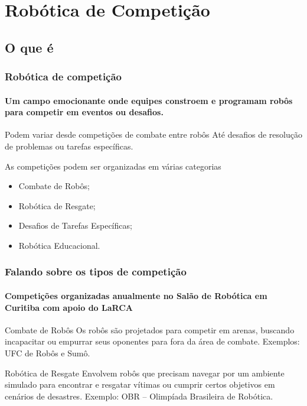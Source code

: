 \documentclass{beamer}
\begin{document}
\section{Robótica de Competição}

\subsection{O que é}

\begin{frame}
	\frametitle{Robótica de competição}
	\framesubtitle{Um campo emocionante onde equipes constroem e programam robôs para competir em eventos ou desafios.}
	\begin{block}{Podem variar desde competições de combate entre robôs}
		Até desafios de resolução de problemas ou tarefas específicas. 
	\end{block}
	
	\begin{block}{As competições podem ser organizadas em várias categorias}
		\begin{itemize}
			\item Combate de Robôs;
			\item Robótica de Resgate;
			\item Desafios de Tarefas Específicas;
			\item Robótica Educacional.
		\end{itemize}
	\end{block}

\end{frame}

\begin{frame}
	\frametitle{Falando sobre os tipos de competição}
	\framesubtitle{Competições organizadas anualmente no Salão de Robótica em Curitiba com apoio do LaRCA}
	\begin{block}{Combate de Robôs}
		Os robôs são projetados para competir em arenas, buscando incapacitar ou empurrar seus oponentes para fora da área de combate.
		\linebreak
		\linebreak
		Exemplos: UFC de Robôs e Sumô.
	\end{block}
	\begin{block}{Robótica de Resgate}
		Envolvem robôs que precisam navegar por um ambiente simulado para encontrar e resgatar vítimas ou cumprir certos objetivos em cenários de desastres.
		\linebreak
		\linebreak
		Exemplo: OBR -- Olimpíada Brasileira de Robótica.
	\end{block}

\end{frame}
\end{document}
